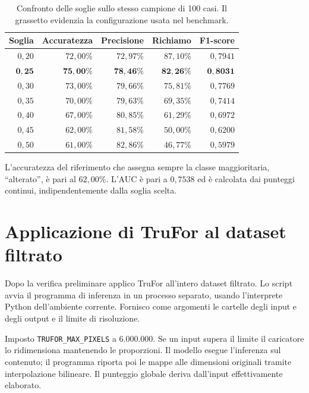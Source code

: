 \begin{table}[htbp]
    \centering
    \small
    \caption{Confronto delle soglie sullo stesso campione di 100 casi. Il grassetto evidenzia la configurazione usata nel benchmark.}
    \label{tab:trufor-confronto-soglie}
    \begin{tabular}{@{}rrrrr@{}}
        \toprule
        Soglia & Accuratezza & Precisione & Richiamo & F1-score \\
        \midrule
        $0{,}20$ & $72{,}00\%$ & $72{,}97\%$ & $87{,}10\%$ & $0{,}7941$ \\
        $\mathbf{0{,}25}$ & $\mathbf{75{,}00\%}$ & $\mathbf{78{,}46\%}$ & $\mathbf{82{,}26\%}$ & $\mathbf{0{,}8031}$ \\
        $0{,}30$ & $73{,}00\%$ & $79{,}66\%$ & $75{,}81\%$ & $0{,}7769$ \\
        $0{,}35$ & $70{,}00\%$ & $79{,}63\%$ & $69{,}35\%$ & $0{,}7414$ \\
        $0{,}40$ & $67{,}00\%$ & $80{,}85\%$ & $61{,}29\%$ & $0{,}6972$ \\
        $0{,}45$ & $62{,}00\%$ & $81{,}58\%$ & $50{,}00\%$ & $0{,}6200$ \\
        $0{,}50$ & $61{,}00\%$ & $82{,}86\%$ & $46{,}77\%$ & $0{,}5979$ \\
        \bottomrule
    \end{tabular}

    \medskip
    \begin{minipage}{0.9\linewidth}
        \small
        L'accuratezza del riferimento che assegna sempre la classe maggioritaria, ``alterato'', è pari al $62{,}00\%$. L'AUC è pari a $0{,}7538$ ed è calcolata dai punteggi continui, indipendentemente dalla soglia scelta.
    \end{minipage}
\end{table}

\section{Applicazione di TruFor al dataset filtrato}
\label{sec:metodi-trufor-esecuzione}

Dopo la verifica preliminare applico TruFor all'intero dataset filtrato. Lo script  avvia il programma di inferenza in un processo separato, usando l'interprete Python dell'ambiente corrente. Fornisco come argomenti le cartelle degli input e degli output e il limite di risoluzione.

Imposto \texttt{TRUFOR\_MAX\_PIXELS} a 6.000.000. Se un input supera il limite il caricatore lo ridimensiona mantenendo le proporzioni. Il modello esegue l'inferenza sul contenuto; il programma riporta poi le mappe alle dimensioni originali tramite interpolazione bilineare. Il punteggio globale deriva dall'input effettivamente elaborato.

